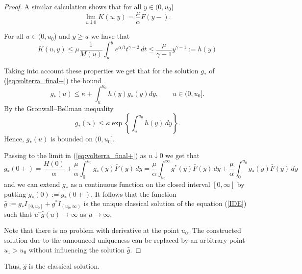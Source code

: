 \begin{proof}
A similar calculation shows that for all $y\in (0,u_0]$
$$
\lim_{u\downarrow 0} K(u,y)=\frac {\mu}{\alpha}\bar F(y-). 
$$

For all $u\in (0,u_0$) and $y\ge u$ we have that 
$$
 K(u,y)\le \mu \frac{1}{M(u)} \int_u^{y}e^{\alpha/t} t^{\gamma-2}\,dt\le \frac {\mu}{\gamma -1}y^{\gamma-1}:=h(y)
$$

Taking into account these properties we get that for the solution $g_*$ of (\ref{eq:volterra_final+}) the bound 
$$
g_*(u)\le \kappa+ \int_u^{u_0}h(y)g_*(y)dy, \qquad u \in (0,u_0].
$$
By the Gronwall--Bellman inequality 
$$
g_*(u)\le \kappa \exp \left\{ \int_u^{u_0}h(y)\,dy \right\}.
$$
Hence, $g_*(u)$ is bounded on $(0,u_0]$. 

Passing to the limit in (\ref{eq:volterra_final+}) as $u\downarrow 0$ we get that 
$$
g_*(0+)=\frac{H(0)}{\alpha}+\frac{\mu }{\alpha}\int_0^{u_0}g_*(y)\bar F(y) \,dy=\frac {\mu}{\alpha}\int_{u_0}^{\infty}g^*(y)\bar F(y)\,dy+\frac{\mu }{\alpha}\int_0^{u_0}g_*(y)\bar F(y) \,dy
$$
and we can extend $g_*$ as a continuous function on the closed interval $[0,\infty]$ by putting $g_*(0):=g_*(0+)$. 
It follows that the function $\hat g:= g_*I_{[0,u_0]}+g^*I_{(u_0,\infty)}$ is the unique classical solution of the equation (\ref{IDE}) such that 
$u^\gamma \hat g(u)\to \infty$ as $u\to \infty$. 

Note that there is no problem with derivative at the point $u_0$. The constructed solution due to the announced uniqueness can be replaced by an arbitrary point $u_1>u_0$ without influencing the solution $\hat g$. \fdem
\end{proof}

Thus, $\hat g$ is the classical solution. 

